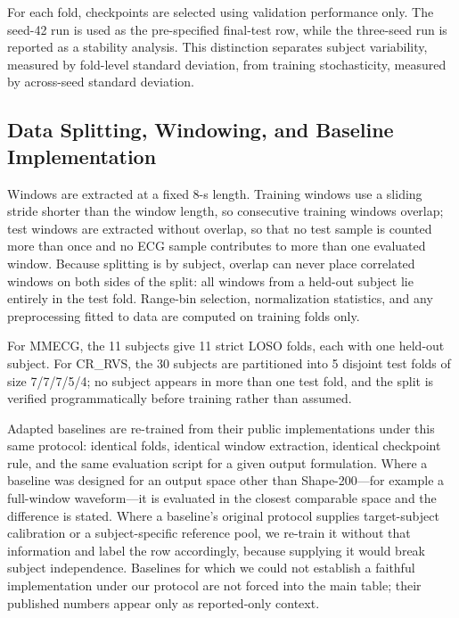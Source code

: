\documentclass[lettersize,journal]{IEEEtran}
\newcommand{\shape}{Shape-200\xspace}
\newcommand{\crrvs}{CR\_RVS\xspace}
\begin{document}
For each fold, checkpoints are selected using validation performance only. The seed-42 run is used as the pre-specified final-test row, while the three-seed run is reported as a stability analysis. This distinction separates subject variability, measured by fold-level standard deviation, from training stochasticity, measured by across-seed standard deviation.

\subsection{Data Splitting, Windowing, and Baseline Implementation}
\label{sec:protocol_details}

Windows are extracted at a fixed 8-s length. Training windows use a sliding stride shorter than the window length, so consecutive training windows overlap; test windows are extracted without overlap, so that no test sample is counted more than once and no ECG sample contributes to more than one evaluated window. Because splitting is by subject, overlap can never place correlated windows on both sides of the split: all windows from a held-out subject lie entirely in the test fold. Range-bin selection, normalization statistics, and any preprocessing fitted to data are computed on training folds only.

For MMECG, the 11 subjects give 11 strict LOSO folds, each with one held-out subject. For \crrvs, the 30 subjects are partitioned into 5 disjoint test folds of size 7/7/7/5/4; no subject appears in more than one test fold, and the split is verified programmatically before training rather than assumed.

Adapted baselines are re-trained from their public implementations under this same protocol: identical folds, identical window extraction, identical checkpoint rule, and the same evaluation script for a given output formulation. Where a baseline was designed for an output space other than \shape---for example a full-window waveform---it is evaluated in the closest comparable space and the difference is stated. Where a baseline's original protocol supplies target-subject calibration or a subject-specific reference pool, we re-train it without that information and label the row accordingly, because supplying it would break subject independence. Baselines for which we could not establish a faithful implementation under our protocol are not forced into the main table; their published numbers appear only as reported-only context.
\end{document}

